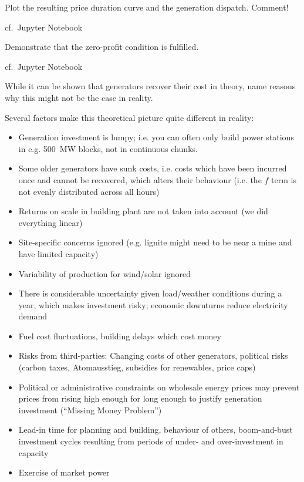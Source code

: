 \documentclass[11pt,a4paper,fleqn]{scrartcl}
\begin{document}
\begin{enumerate}[(a)]
 \begin{shaded}\item Plot the resulting price duration curve and the generation dispatch. Comment!\end{shaded}
 cf.\ Jupyter Notebook
 \begin{shaded}\item Demonstrate that the zero-profit condition is fulfilled.\end{shaded}
 cf.\ Jupyter Notebook
 \begin{shaded}
  \item While it can be shown that generators recover their cost in theory, name reasons why this might not be the case in reality.
 \end{shaded}
 Several factors make this theoretical picture quite different in reality:
 \begin{itemize}
  \item Generation investment is lumpy; i.e. you can often only
        build power stations in e.g. 500~MW blocks, not in continuous chunks.
  \item Some older generators have sunk costs, i.e. costs which have been incurred once and cannot be recovered, which alters their behaviour (i.e. the $f$ term is not evenly distributed across all hours)
  \item Returns on scale in building plant are not taken into account (we did everything linear)
  \item Site-specific concerns ignored (e.g. lignite might need to be near a mine and have limited capacity)
  \item Variability of production for wind/solar ignored
  \item There is considerable  uncertainty given load/weather conditions during a year, which makes investment risky; economic downturns reduce electricity demand
  \item Fuel cost fluctuations, building delays which cost money
  \item Risks from third-parties:  Changing costs of other generators, political risks (carbon taxes,  Atomausstieg, subsidies for renewables, price caps)
  \item Political or administrative constraints on wholesale energy
        prices may prevent prices from rising high enough for long enough
        to justify generation investment (``Missing Money Problem'')
  \item  Lead-in time for planning and building, behaviour of others, boom-and-bust investment cycles resulting from periods of under- and over-investment in capacity
  \item Exercise of market power
 \end{itemize}
\end{enumerate}
\end{document}
